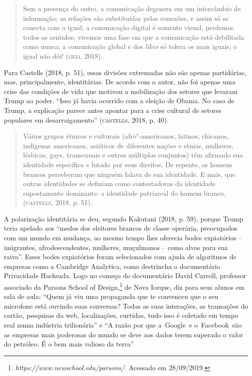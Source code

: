 \begin{quote}
Sem a presença do outro, a comunicação degenera em um intercâmbio de
informação: as relações são substituídas pelas conexões, e assim só se
conecta com o igual; a comunicação digital é somente visual, perdemos
todos os sentidos; vivemos uma fase em que a comunicação está debilitada
como nunca: a comunicação global e dos \emph{likes} só tolera os mais
iguais; o igual não dói! (\textsc{geli}, 2018).
\end{quote}

Para Castells (2018, p. 51), essas divisões extremadas não são apenas
partidárias, mas, principalmente, identitárias. De acordo com o autor,
não foi apenas uma crise das condições de vida que motivou a mobilização
dos setores que levaram Trump ao poder. ``Isso já havia ocorrido com a
eleição de Obama. No caso de Trump, a explicação parece antes apontar
para a crise cultural de setores populares em desarraigamento''
(\textsc{castells}, 2018, p. 40).

\begin{quote}
Vários grupos étnicos e culturais (afro"-americanos, latinos, chicanos,
indígenas americanos, asiáticos de diferentes nações e etnias, mulheres,
lésbicas, gays, transexuais e outros múltiplos conjuntos) têm afirmado
sua identidade específica e lutado por seus direitos. De repente, os
homens brancos perceberam que ninguém falava de sua identidade. E mais,
que outras identidades se definiam como contestadoras da identidade
supostamente dominante: a identidade patriarcal do homem branco.
(\textsc{castells}, 2018, p. 51).
\end{quote}

A polarização identitária se deu, segundo Kakutani (2018, p. 59), porque
Trump teria apelado aos ``medos dos eleitores brancos de classe
operária, preocupados com um mundo em mudança, ao mesmo tempo lhes
oferecia bodes expiatórios -- imigrantes, afrodescendentes, mulheres,
muçulmanos -- como alvos para sua raiva''. Esses bodes expiatórios foram
selecionados com ajuda de algoritmos de empresas como a Cambridge
Analytica, como destrincha o documentário Privacidade Hackeada. Logo no
começo do documentário David Carroll, professor associado da Parsons
School of Design,\footnote{\emph{https://www.newschool.edu/parsons/}.
  Acessado em 28/09/2019.} de Nova Iorque, diz para seus alunos em sala
de aula: ``Quem já viu uma propaganda que te convenceu que o seu
microfone está ouvindo suas conversas? Todas as suas interações, as
transações do cartão, pesquisas da web, localizações, curtidas, tudo
isso é coletado em tempo real numa indústria trilionária'' e ``A razão por
que a~Google~e o~Facebook~são as empresas mais poderosas do mundo se
deve aos dados terem superado o valor do petróleo. É o bem mais valioso
da terra''

